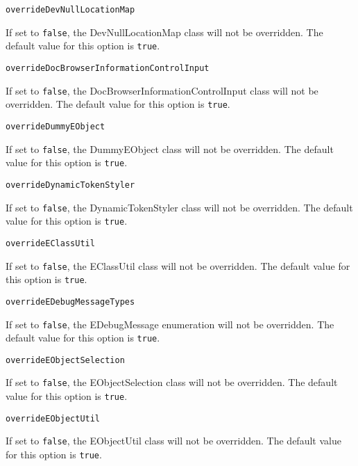 \noindent\texttt{overrideDevNullLocationMap}
\begin{myindentpar}{1cm}
If set to \texttt{false}, the DevNullLocationMap class will not be overridden. The default value for this option is \texttt{true}.
\end{myindentpar}

\noindent\texttt{overrideDocBrowserInformationControlInput}
\begin{myindentpar}{1cm}
If set to \texttt{false}, the DocBrowserInformationControlInput class will not be overridden. The default value for this option is \texttt{true}.
\end{myindentpar}

\noindent\texttt{overrideDummyEObject}
\begin{myindentpar}{1cm}
If set to \texttt{false}, the DummyEObject class will not be overridden. The default value for this option is \texttt{true}.
\end{myindentpar}

\noindent\texttt{overrideDynamicTokenStyler}
\begin{myindentpar}{1cm}
If set to \texttt{false}, the DynamicTokenStyler class will not be overridden. The default value for this option is \texttt{true}.
\end{myindentpar}

\noindent\texttt{overrideEClassUtil}
\begin{myindentpar}{1cm}
If set to \texttt{false}, the EClassUtil class will not be overridden. The default value for this option is \texttt{true}.
\end{myindentpar}

\noindent\texttt{overrideEDebugMessageTypes}
\begin{myindentpar}{1cm}
If set to \texttt{false}, the EDebugMessage enumeration will not be overridden. The default value for this option is \texttt{true}.
\end{myindentpar}

\noindent\texttt{overrideEObjectSelection}
\begin{myindentpar}{1cm}
If set to \texttt{false}, the EObjectSelection class will not be overridden. The default value for this option is \texttt{true}.
\end{myindentpar}

\noindent\texttt{overrideEObjectUtil}
\begin{myindentpar}{1cm}
If set to \texttt{false}, the EObjectUtil class will not be overridden. The default value for this option is \texttt{true}.
\end{myindentpar}

